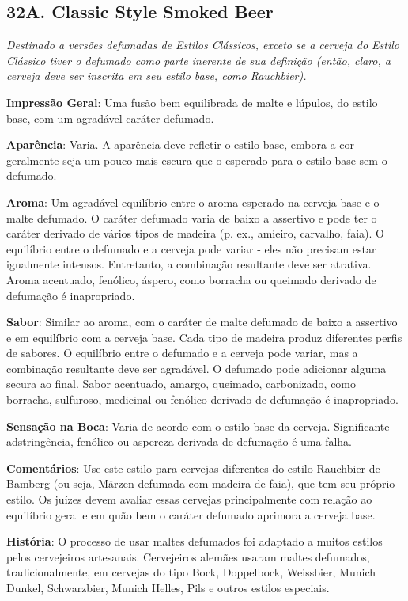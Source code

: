 \subsection*{32A. Classic Style Smoked Beer}

\textit{Destinado a versões defumadas de Estilos Clássicos, exceto se a cerveja do Estilo Clássico tiver o defumado como parte inerente de sua definição (então, claro, a cerveja deve ser inscrita em seu estilo base, como Rauchbier).}

\textbf{Impressão Geral}: Uma fusão bem equilibrada de malte e lúpulos, do estilo base, com um agradável caráter defumado.

\textbf{Aparência}: Varia. A aparência deve refletir o estilo base, embora a cor geralmente seja um pouco mais escura que o esperado para o estilo base sem o defumado.

\textbf{Aroma}: Um agradável equilíbrio entre o aroma esperado na cerveja base e o malte defumado. O caráter defumado varia de baixo a assertivo e pode ter o caráter derivado de vários tipos de madeira (p. ex., amieiro, carvalho, faia). O equilíbrio entre o defumado e a cerveja pode variar - eles não precisam estar igualmente intensos. Entretanto, a combinação resultante deve ser atrativa. Aroma acentuado, fenólico, áspero, como borracha ou queimado derivado de defumação é inapropriado.

\textbf{Sabor}: Similar ao aroma, com o caráter de malte defumado de baixo a assertivo e em equilíbrio com a cerveja base. Cada tipo de madeira produz diferentes perfis de sabores. O equilíbrio entre o defumado e a cerveja pode variar, mas a combinação resultante deve ser agradável. O defumado pode adicionar alguma secura ao final. Sabor acentuado, amargo, queimado, carbonizado, como borracha, sulfuroso, medicinal ou fenólico derivado de defumação é inapropriado.

\textbf{Sensação na Boca}: Varia de acordo com o estilo base da cerveja. Significante adstringência, fenólico ou aspereza derivada de defumação é uma falha.

\textbf{Comentários}: Use este estilo para cervejas diferentes do estilo Rauchbier de Bamberg (ou seja, Märzen defumada com madeira de faia), que tem seu próprio estilo. Os juízes devem avaliar essas cervejas principalmente com relação ao equilíbrio geral e em quão bem o caráter defumado aprimora a cerveja base.

\textbf{História}: O processo de usar maltes defumados foi adaptado a muitos estilos pelos cervejeiros artesanais. Cervejeiros alemães usaram maltes defumados, tradicionalmente, em cervejas do tipo Bock, Doppelbock, Weissbier, Munich Dunkel, Schwarzbier, Munich Helles, Pils e outros estilos especiais.

